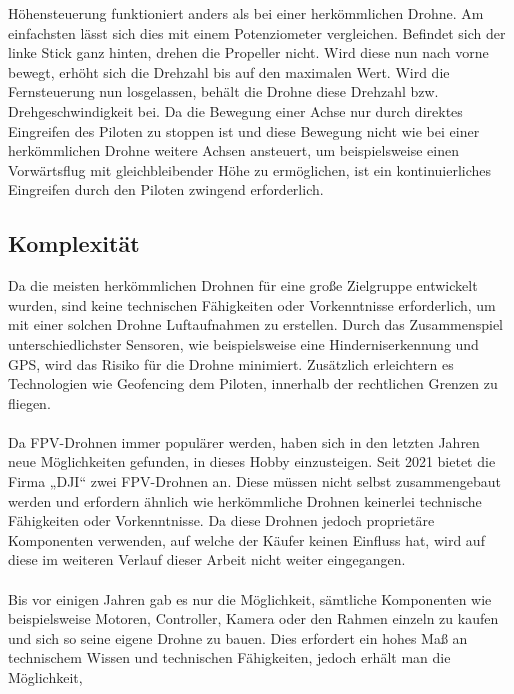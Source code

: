         Höhensteuerung funktioniert anders als bei einer herkömmlichen Drohne. Am einfachsten lässt sich dies mit
        einem Potenziometer vergleichen. Befindet sich der linke Stick ganz hinten, drehen die Propeller nicht.
        Wird diese nun nach vorne bewegt, erhöht sich die Drehzahl bis auf den maximalen Wert. Wird die Fernsteuerung
        nun losgelassen, behält die Drohne diese Drehzahl bzw. Drehgeschwindigkeit bei. Da die Bewegung einer Achse
        nur durch direktes Eingreifen des Piloten zu stoppen ist und diese Bewegung nicht wie bei einer herkömmlichen
        Drohne weitere Achsen ansteuert, um beispielsweise einen Vorwärtsflug mit gleichbleibender Höhe zu ermöglichen,
        ist ein kontinuierliches Eingreifen durch den Piloten zwingend erforderlich.

    \subsection[Komplexität]{Komplexität}
        Da die meisten herkömmlichen Drohnen für eine große Zielgruppe entwickelt wurden, sind keine technischen
        Fähigkeiten oder Vorkenntnisse erforderlich, um mit einer solchen Drohne Luftaufnahmen zu erstellen.\cite{shon2022}
        Durch das Zusammenspiel unterschiedlichster Sensoren, wie beispielsweise eine Hinderniserkennung und GPS,
        wird das Risiko für die Drohne minimiert. Zusätzlich erleichtern es Technologien wie Geofencing dem Piloten,
        innerhalb der rechtlichen Grenzen zu fliegen. \\
        \\
        Da FPV-Drohnen immer populärer werden, haben sich in den letzten Jahren neue Möglichkeiten gefunden, in
        dieses Hobby einzusteigen. Seit 2021 bietet die Firma „DJI“ zwei FPV-Drohnen an. Diese müssen nicht selbst
        zusammengebaut werden und erfordern ähnlich wie herkömmliche Drohnen keinerlei technische Fähigkeiten oder
        Vorkenntnisse.\cite{DJIAvatar}\cite{DJIFpv} Da diese Drohnen jedoch proprietäre Komponenten verwenden, auf welche der Käufer keinen Einfluss
        hat, wird auf diese im weiteren Verlauf dieser Arbeit nicht weiter eingegangen. \\
        \\
        Bis vor einigen Jahren gab es nur die Möglichkeit, sämtliche Komponenten wie beispielsweise Motoren,
        Controller, Kamera oder den Rahmen einzeln zu kaufen und sich so seine eigene Drohne zu bauen. Dies
        erfordert ein hohes Maß an technischem Wissen und technischen Fähigkeiten, jedoch erhält man die Möglichkeit,
